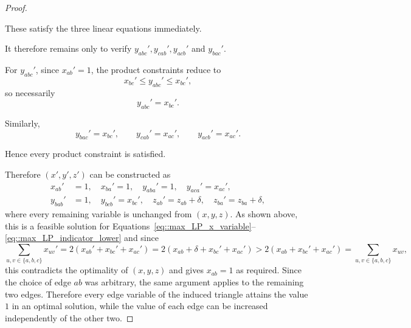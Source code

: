 \documentclass[11pt]{article}
\begin{document}
\begin{proof}
\begin{enumerate}[label=\Alph*.]
      These satisfy the three linear equations immediately.

      It therefore remains only to verify
      $y_{abc}',y_{cab}',y_{acb}'$ and $y_{bac}'$.

      For $y_{abc}'$, since $x_{ab}'=1$, the product constraints reduce to
      \[
      x_{bc}'
      \le
      y_{abc}'
      \le
      x_{bc}',
      \]
      so necessarily
      \[
      y_{abc}'=x_{bc}'.
      \]

      Similarly,
      \[
      y_{bac}'=x_{bc}',
      \qquad
      y_{cab}'=x_{ac}',
      \qquad
      y_{acb}'=x_{ac}'.
      \]

      Hence every product constraint is satisfied.
  \end{enumerate}
  Therefore $(x',y',z')$ can be constructed as 
  \begin{align*}
  x_{ab}'&=1,\quad x_{ba}'=1,\quad y_{aba}'=1,\quad y_{aca}'=x_{ac}',\\
  y_{bab}'&=1,\quad y_{bcb}'=x_{bc}',\quad z_{ab}'=z_{ab}+\delta,\quad z_{ba}'=z_{ba}+\delta,
  \end{align*}
  where every remaining variable is unchanged from $(x,y,z)$. As shown above, this is a feasible solution for Equations~\eqref{eq::max_LP_x_variable}--\eqref{eq::max_LP_indicator_lower} and since
  \[
  \sum_{u,v\in\{a,b,c\}}x_{uv}' = 2(x_{ab}'+x_{bc}'+x_{ac}') = 2(x_{ab} + \delta + x_{bc}'+x_{ac}') > 2(x_{ab}+x_{bc}'+x_{ac}')  = \sum_{u,v\in\{a,b,c\}}x_{uv},
  \]
  this contradicts the optimality of $(x,y,z)$ and gives $x_{ab}=1$ as required. Since the choice of edge $ab$ was arbitrary, the same argument applies to the remaining two edges. Therefore every edge variable of the induced triangle attains the value $1$ in an optimal solution, while the value of each edge can be increased independently of the other two. 
\end{proof}
\end{document}
